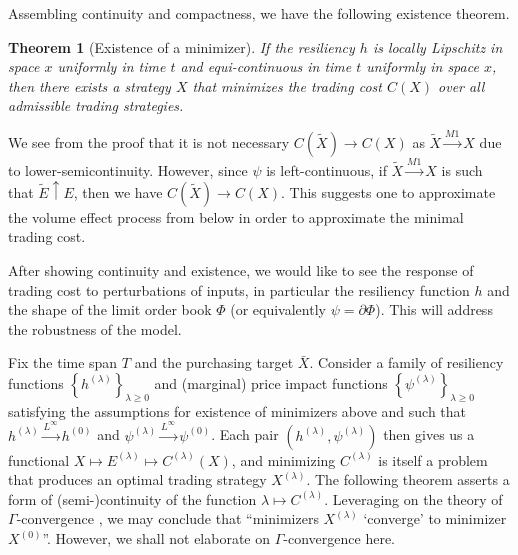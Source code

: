 \documentclass[openany,oneside]{article}
\newtheorem{thm}{Theorem}[section]
\theoremstyle{definition}
\theoremstyle{remark}
\begin{document}
Assembling continuity and compactness, we have the following existence theorem.
\begin{thm}[Existence of a minimizer]
If the resiliency $h$ is locally Lipschitz in space $x$ uniformly in time $t$ and equi-continuous in time $t$ uniformly in space $x$, then there exists a strategy $X$ that minimizes the trading cost $C(X)$ over all admissible trading strategies.
\end{thm}

We see from the proof that it is not necessary $C(\tilde{X}) \to C(X)$ as $\tilde{X} \xrightarrow{M1} X$ due to lower-semicontinuity. However, since $\psi$ is left-continuous, if $\tilde{X} \xrightarrow{M1} X$ is such that $\tilde{E} \uparrow E$, then we have $C(\tilde{X}) \to C(X)$. This suggests one to approximate the volume effect process from below in order to approximate the minimal trading cost.

After showing continuity and existence, we would like to see the response of trading cost to perturbations of inputs, in particular the resiliency function $h$ and the shape of the limit order book $\Phi$ (or equivalently $\psi = \partial \Phi$). This will address the robustness of the model.

Fix the time span $T$ and the purchasing target $\bar{X}$. Consider a family of resiliency functions $\left\{h^{(\lambda)}\right\}_{\lambda\ge 0}$ and (marginal) price impact functions $\left\{\psi^{(\lambda)}\right\}_{\lambda\ge 0}$ satisfying the assumptions for existence of minimizers above and such that $h^{(\lambda)} \xrightarrow{L^\infty} h^{(0)}$ and $\psi^{(\lambda)} \xrightarrow{L^\infty} \psi^{(0)}$. Each pair $\left(h^{(\lambda)}, \psi^{(\lambda)}\right)$ then gives us a functional $X\mapsto E^{(\lambda)} \mapsto C^{(\lambda)}(X)$, and minimizing $C^{(\lambda)}$ is itself a problem that produces an optimal trading strategy $X^{(\lambda)}$. The following theorem asserts a form of (semi-)continuity of the function $\lambda \mapsto C^{(\lambda)}$. Leveraging on the theory of $\Gamma$-convergence \cite{GammaConv}, we may conclude that ``minimizers $X^{(\lambda)}$ `converge' to minimizer $X^{(0)}$''. However, we shall not elaborate on $\Gamma$-convergence here.
\end{document}
